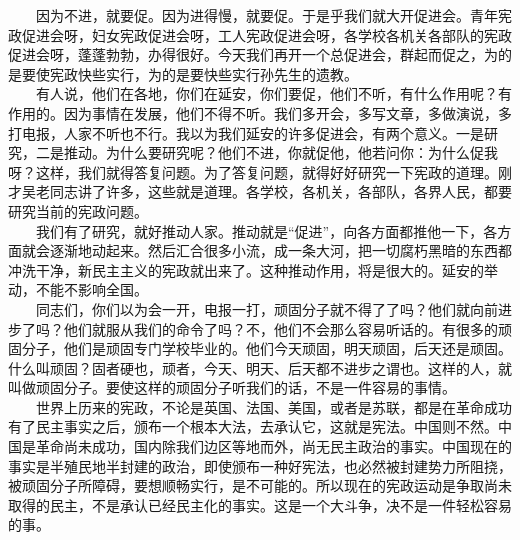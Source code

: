 \documentclass[cn,11pt,chinese]{elegantbook}
\begin{document}
　　因为不进，就要促。因为进得慢，就要促。于是乎我们就大开促进会。青年宪政促进会呀，妇女宪政促进会呀，工人宪政促进会呀，各学校各机关各部队的宪政促进会呀，蓬蓬勃勃，办得很好。今天我们再开一个总促进会，群起而促之，为的是要使宪政快些实行，为的是要快些实行孙先生的遗教。\\
　　有人说，他们在各地，你们在延安，你们要促，他们不听，有什么作用呢？有作用的。因为事情在发展，他们不得不听。我们多开会，多写文章，多做演说，多打电报，人家不听也不行。我以为我们延安的许多促进会，有两个意义。一是研究，二是推动。为什么要研究呢？他们不进，你就促他，他若问你：为什么促我呀？这样，我们就得答复问题。为了答复问题，就得好好研究一下宪政的道理。刚才吴老同志讲了许多，这些就是道理。各学校，各机关，各部队，各界人民，都要研究当前的宪政问题。\\
　　我们有了研究，就好推动人家。推动就是“促进”，向各方面都推他一下，各方面就会逐渐地动起来。然后汇合很多小流，成一条大河，把一切腐朽黑暗的东西都冲洗干净，新民主主义的宪政就出来了。这种推动作用，将是很大的。延安的举动，不能不影响全国。\\
　　同志们，你们以为会一开，电报一打，顽固分子就不得了了吗？他们就向前进步了吗？他们就服从我们的命令了吗？不，他们不会那么容易听话的。有很多的顽固分子，他们是顽固专门学校毕业的。他们今天顽固，明天顽固，后天还是顽固。什么叫顽固？固者硬也，顽者，今天、明天、后天都不进步之谓也。这样的人，就叫做顽固分子。要使这样的顽固分子听我们的话，不是一件容易的事情。\\
　　世界上历来的宪政，不论是英国、法国、美国，或者是苏联，都是在革命成功有了民主事实之后，颁布一个根本大法，去承认它，这就是宪法。中国则不然。中国是革命尚未成功，国内除我们边区等地而外，尚无民主政治的事实。中国现在的事实是半殖民地半封建的政治，即使颁布一种好宪法，也必然被封建势力所阻挠，被顽固分子所障碍，要想顺畅实行，是不可能的。所以现在的宪政运动是争取尚未取得的民主，不是承认已经民主化的事实。这是一个大斗争，决不是一件轻松容易的事。\\
\end{document}

